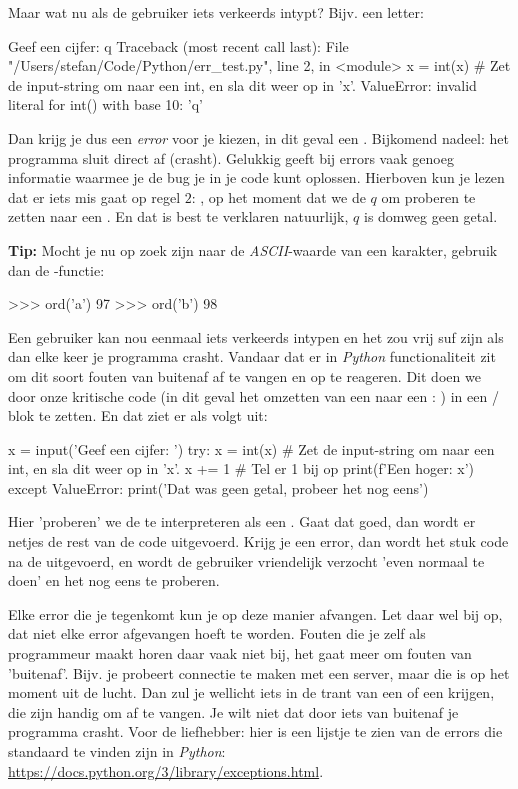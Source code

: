 Maar wat nu als de gebruiker iets verkeerds intypt? Bijv. een letter:
\begin{python}
Geef een cijfer: q
Traceback (most recent call last):
  File "/Users/stefan/Code/Python/err_test.py", line 2, in <module>
    x = int(x)  # Zet de input-string om naar een int, en sla dit weer op in 'x'.
ValueError: invalid literal for int() with base 10: 'q'
\end{python}
Dan krijg je dus een \textit{error} voor je kiezen, in dit geval een . Bijkomend nadeel: het programma sluit direct af (crasht). Gelukkig geeft  bij errors vaak genoeg informatie waarmee je de bug je in je code kunt oplossen. Hierboven kun je lezen dat er iets mis gaat op regel $2$: , op het moment dat we de  $q$ om proberen te zetten naar een . En dat is best te verklaren natuurlijk, $q$ is domweg geen getal. 

\begin{remark}
\textbf{Tip: } Mocht je nu op zoek zijn naar de \textit{ASCII}-waarde van een karakter, gebruik dan de -functie:
\begin{python}
>>> ord('a')
97
>>> ord('b')
98
\end{python}
\end{remark}

Een gebruiker kan nou eenmaal iets verkeerds intypen en het zou vrij suf zijn als dan elke keer je programma crasht. Vandaar dat er in \textit{Python} functionaliteit zit om dit soort fouten van buitenaf af te vangen en op te reageren. Dit doen we door onze kritische code (in dit geval het omzetten van een  naar een : ) in een  /  blok te zetten. En dat ziet er als volgt uit:

\begin{python}
x = input('Geef een cijfer: ')
try:
	x = int(x)  # Zet de input-string om naar een int, en sla dit weer op in 'x'.
	x += 1  # Tel er 1 bij op
	print(f'Een hoger: {x}')
except ValueError:
    print('Dat was geen getal, probeer het nog eens')
\end{python}

Hier 'proberen' we de  te interpreteren als een . Gaat dat goed, dan wordt er netjes de rest van de code uitgevoerd. Krijg je een error, dan wordt het stuk code na de  uitgevoerd, en wordt de gebruiker vriendelijk verzocht 'even normaal te doen' en het nog eens te proberen. 

Elke error die je tegenkomt kun je op deze manier afvangen. Let daar wel bij op, dat niet elke error afgevangen hoeft te worden. Fouten die je zelf als programmeur maakt horen daar vaak niet bij, het gaat meer om fouten van 'buitenaf'. Bijv. je probeert connectie te maken met een server, maar die is op het moment uit de lucht. Dan zul je wellicht iets in de trant van een  of een  krijgen, die zijn handig om af te vangen. Je wilt niet dat door iets van buitenaf je programma crasht. Voor de liefhebber: hier is een lijstje te zien van de errors die standaard te vinden zijn in \textit{Python}: \url{https://docs.python.org/3/library/exceptions.html}.

